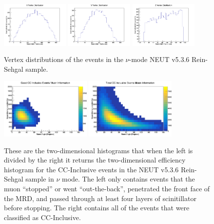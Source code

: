 \documentclass[11pt]{article}
\begin{document}
\begin{figure}[H]
\centering
\includegraphics[width=0.3\textwidth]{NewNMReinSehgalImages/4-XVertexDistributionNMRS.png}
\includegraphics[width=0.3\textwidth]{NewNMReinSehgalImages/3-YVertexDistributionNMRS.png}
\includegraphics[width=0.3\textwidth]{NewNMReinSehgalImages/2-ZVertexDistributionNMRS.png}
\caption{Vertex distributions of the events in the $\nu$-mode NEUT v5.3.6 Rein-Sehgal sample.}
\label{fig:app:NMVertexDistributionRS}
\end{figure}

\begin{figure}[H]
\centering
\includegraphics[width=0.4\textwidth]{NewNMReinSehgalImages/7.png}
\includegraphics[width=0.4\textwidth]{NewNMReinSehgalImages/8.png}
\caption{These are the two-dimensional histograms that when the left is divided by the right it returns the two-dimensional efficiency histogram for the CC-Inclusive events in the NEUT v5.3.6 Rein-Sehgal sample in $\nu$ mode. The left only contains events that the muon ``stopped'' or went ``out-the-back'', penetrated the front face of the MRD, and passed through at least four layers of scinitillator before stopping. The right contains all of the events that were classified as CC-Inclusive.}
\label{fig:app:NMCCInclusiveMuon2DRS}
\end{figure}
\end{document}
